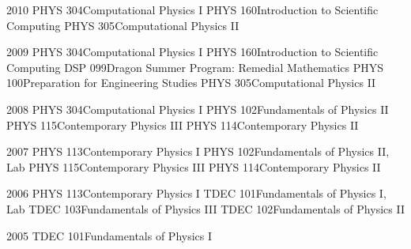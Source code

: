 \documentclass[]{scrartcl}
\begin{document}
\begin{cleanCV}
\Teaching
{2010}
{PHYS 304}{Computational Physics I\TeachingNote}
\Teaching
{}
{PHYS 160}{Introduction to Scientific Computing\TeachingNote}
\Teaching
{}
{PHYS 305}{Computational Physics II\TeachingNote}

\Teaching
{2009}
{PHYS 304}{Computational Physics I\TeachingNote}
\Teaching
{}
{PHYS 160}{Introduction to Scientific Computing\TeachingNote}
\Teaching
{}
{DSP 099}{Dragon Summer Program: Remedial Mathematics}
\Teaching
{}
{PHYS 100}{Preparation for Engineering Studies}
\Teaching
{}
{PHYS 305}{Computational Physics II\TeachingNote}

\Teaching
{2008}
{PHYS 304}{Computational Physics I\TeachingNote}
\Teaching
{}
{PHYS 102}{Fundamentals of Physics II\TeachingNote}
\Teaching
{}
{PHYS 115}{Contemporary Physics III\TeachingNote}
\Teaching
{}
{PHYS 114}{Contemporary Physics II\TeachingNote}

\Teaching
{2007}
{PHYS 113}{Contemporary Physics I\TeachingNote}
\Teaching
{}
{PHYS 102}{Fundamentals of Physics II, Lab}
\Teaching
{}
{PHYS 115}{Contemporary Physics III\TeachingNote}
\Teaching
{}
{PHYS 114}{Contemporary Physics II\TeachingNote}

\Teaching
{2006}
{PHYS 113}{Contemporary Physics I\TeachingNote}
\Teaching
{}
{TDEC 101}{Fundamentals of Physics I, Lab}
\Teaching
{}
{TDEC 103}{Fundamentals of Physics III\TeachingNote}
\Teaching
{}
{TDEC 102}{Fundamentals of Physics II\TeachingNote}

\Teaching
{2005}
{TDEC 101}{Fundamentals of Physics I\TeachingNote}




\end{cleanCV}
\end{document}
